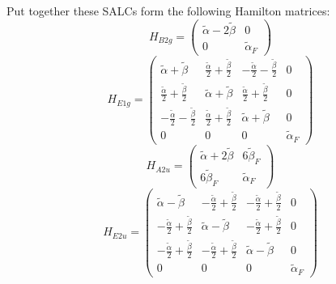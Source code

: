 \documentclass[12pt,a4paper]{article}
\begin{document}
Put together these SALCs form the following Hamilton matrices:
     $$ H_{B2g}= \begin{pmatrix}\tilde{\alpha} - 2 \tilde{\beta} & 0\\0 & \tilde{\alpha}_{F}\end{pmatrix}$$ 
     $$ H_{E1g}= \begin{pmatrix}\tilde{\alpha} + \tilde{\beta} & \frac{\tilde{\alpha}}{2} + \frac{\tilde{\beta}}{2} & - \frac{\tilde{\alpha}}{2} - \frac{\tilde{\beta}}{2} & 0\\\frac{\tilde{\alpha}}{2} + \frac{\tilde{\beta}}{2} & \tilde{\alpha} + \tilde{\beta} & \frac{\tilde{\alpha}}{2} + \frac{\tilde{\beta}}{2} & 0\\- \frac{\tilde{\alpha}}{2} - \frac{\tilde{\beta}}{2} & \frac{\tilde{\alpha}}{2} + \frac{\tilde{\beta}}{2} & \tilde{\alpha} + \tilde{\beta} & 0\\0 & 0 & 0 & \tilde{\alpha}_{F}\end{pmatrix}$$ 
     $$ H_{A2u}= \begin{pmatrix}\tilde{\alpha} + 2 \tilde{\beta} & 6 \tilde{\beta}_{F}\\6 \tilde{\beta}_{F} & \tilde{\alpha}_{F}\end{pmatrix}$$ 
     $$ H_{E2u}= \begin{pmatrix}\tilde{\alpha} - \tilde{\beta} & - \frac{\tilde{\alpha}}{2} + \frac{\tilde{\beta}}{2} & - \frac{\tilde{\alpha}}{2} + \frac{\tilde{\beta}}{2} & 0\\- \frac{\tilde{\alpha}}{2} + \frac{\tilde{\beta}}{2} & \tilde{\alpha} - \tilde{\beta} & - \frac{\tilde{\alpha}}{2} + \frac{\tilde{\beta}}{2} & 0\\- \frac{\tilde{\alpha}}{2} + \frac{\tilde{\beta}}{2} & - \frac{\tilde{\alpha}}{2} + \frac{\tilde{\beta}}{2} & \tilde{\alpha} - \tilde{\beta} & 0\\0 & 0 & 0 & \tilde{\alpha}_{F}\end{pmatrix}$$ 
\end{document}
